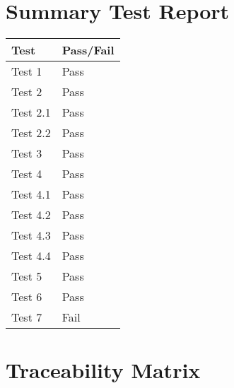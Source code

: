 \documentclass[11pt]{article}
\begin{document}
\section{Summary Test Report}
\begin{table}[h]
\begin{tabular}{ll}
\textbf{Test}     & \textbf{Pass/Fail} \\ \hline
\multicolumn{1}{|L{10cm}|}{Test 1} & \multicolumn{1}{L{2cm}|}{Pass} \\ \hline
\multicolumn{1}{|L{10cm}|}{Test 2} & \multicolumn{1}{L{2cm}|}{Pass} \\ \hline
\multicolumn{1}{|L{10cm}|}{Test 2.1} & \multicolumn{1}{L{2cm}|}{Pass} \\ \hline
\multicolumn{1}{|L{10cm}|}{Test 2.2} & \multicolumn{1}{L{2cm}|}{Pass} \\ \hline
\multicolumn{1}{|L{10cm}|}{Test 3} & \multicolumn{1}{L{2cm}|}{Pass} \\ \hline
\multicolumn{1}{|L{10cm}|}{Test 4} & \multicolumn{1}{L{2cm}|}{Pass} \\ \hline
\multicolumn{1}{|L{10cm}|}{Test 4.1} & \multicolumn{1}{L{2cm}|}{Pass} \\ \hline
\multicolumn{1}{|L{10cm}|}{Test 4.2} & \multicolumn{1}{L{2cm}|}{Pass} \\ \hline
\multicolumn{1}{|L{10cm}|}{Test 4.3} & \multicolumn{1}{L{2cm}|}{Pass} \\ \hline
\multicolumn{1}{|L{10cm}|}{Test 4.4} & \multicolumn{1}{L{2cm}|}{Pass} \\ \hline
\multicolumn{1}{|L{10cm}|}{Test 5} & \multicolumn{1}{L{2cm}|}{Pass} \\ \hline
\multicolumn{1}{|L{10cm}|}{Test 6} & \multicolumn{1}{L{2cm}|}{Pass} \\ \hline
\multicolumn{1}{|L{10cm}|}{Test 7} & \multicolumn{1}{L{2cm}|}{Fail} \\ \hline
\end{tabular}
\end{table}

\section{Traceability Matrix}
\end{document}
